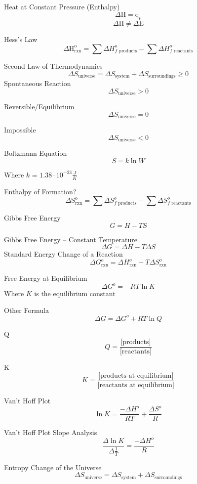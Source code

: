 \documentclass{article}
\begin{document}
\begin{multicols*}{2}
\begin{center}
\vfill\null\columnbreak

Heat at Constant Pressure (Enthalpy)
\[
    \Delta\textrm{H} = \textrm{q}_p
\]
\[
    \Delta \textrm{H} \neq \Delta \textrm{E}
\]

Hess's Law
\[
    \Delta\textrm{H}_{\textrm{rxn}}^{\textrm{o}} = \sum\Delta H_{f \textrm{  products}}^{o} - \sum\Delta H_{f \textrm{  reactants}}^{o}
\]

Second Law of Thermodynamics
\[
    \Delta S_{\textrm{universe}} = \Delta S_{\textrm{system}} + \Delta S_{\textrm{surroundings}} \geq 0
\]
Spontaneous Reaction
\[
    \Delta S_{\textrm{universe}} > 0
\]

Reversible/Equilibrium
\[
    \Delta S_{\textrm{universe}} = 0
\]

Impossible
\[
    \Delta S_{\textrm{universe}} < 0
\]

Boltzmann Equation
\[
S = k\ln{W}
\]

\footnotesize
Where $k$ = $1.38\cdot10^{-23} \frac{J}{K}$\\
\normalsize

Enthalpy of Formation?
\[
    \Delta\textrm{S}_{\textrm{rxn}}^{\textrm{o}} = \sum\Delta S_{f \textrm{  products}}^{o} - \sum\Delta S_{f \textrm{  reactants}}^{o}
\]

Gibbs Free Energy
\[
    G = H - TS
\]

Gibbs Free Energy -- Constant Temperature
\[
    \Delta G = \Delta H - T\Delta S
\]
Standard Energy Change of a Reaction
\[
    \Delta G_{\textrm{rxn}}^o = \Delta H_{\textrm{rxn}}^o - T \Delta S_{\textrm{rxn}}^o
\]

Free Energy at Equilibrium
\[
    \Delta G^o = -RT\ln{K}
\]
\footnotesize
Where $K$ is the equilibrium constant\\
\normalsize

Other Formula
\[
    \Delta G = \Delta G^o + RT \ln{Q}
\]

\vfill\null\columnbreak

Q
\[
    Q = \frac{\textrm{[products]}}{\textrm{[reactants]}}
\]

K
\[
    K = \frac{\textrm{[products at equilibrium]}}{\textrm{[reactants at equilibrium]}}
\]

Van't Hoff Plot
\[
    \ln K = \frac{-\Delta H^o}{RT} + \frac{\Delta S^o}{R}
\]

Van't Hoff Plot Slope Analysis
\[
    \frac{\Delta \ln{K}}{\Delta\frac{1}{T}} = \frac{-\Delta H^o}{R}
\]

Entropy Change of the Universe
\[
    \Delta S_{\textrm{universe}} = \Delta S_{\textrm{system}} + \Delta S_{\textrm{surroundings}}
\]


\end{center}
\end{multicols*}
\end{document}
